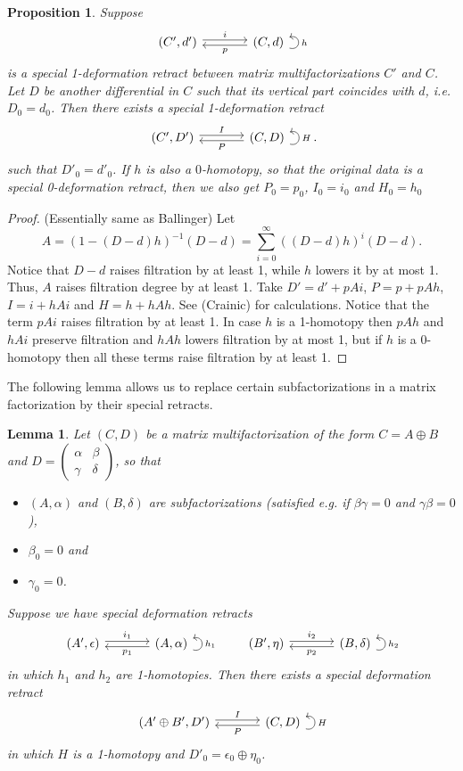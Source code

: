 \documentclass{article}
\newcommand{\sdr}[5]{%
  \begin{tikzcd}[column sep=large, ampersand replacement=\&]
    {#1} \arrow[r, "#3", shift left=0.5ex,] \arrow[r, leftarrow, "#4", shift right=0.5ex, swap] \& 
    {#2} \arrow[loop right, distance=1em, in=15, out=-15, "#5",swap]
  \end{tikzcd}%
}
\theoremstyle{plain} %
\newtheorem{lemma}[theorem]{Lemma}
\newtheorem{proposition}[theorem]{Proposition}
\theoremstyle{definition} %
\theoremstyle{remark} %
\begin{document}
\begin{proposition}\label{specialDefRetract}
Suppose 
$$\sdr{(C',d')}{(C,d)}{i}{p}{h}$$
is a special 1-deformation retract between matrix multifactorizations $C'$ and $C$. Let $D$ be another differential in $C$ such that its vertical part coincides with $d$, i.e. $D_0=d_0$. Then there exists a special 1-deformation retract
$$\sdr{(C',D')}{(C,D)}{I}{P}{H}.$$
such that $D'_0=d'_0$.
If $h$ is also a $0$-homotopy, so that the original data is a special 0-deformation retract, then we also get $P_0=p_0$, $I_0=i_0$ and $H_0=h_0$
\end{proposition}


\begin{proof}(Essentially same as Ballinger) Let 
$$A=(1-(D-d)h)^{-1}(D-d)=\sum_{i=0}^{\infty} ((D-d)h)^i(D-d). $$
Notice that $D-d$ raises filtration by at least 1, while $h$ lowers it by at most 1. Thus, $A$ raises filtration degree by at least 1.
Take $D'=d'+pAi$, $P=p+pAh$, $I=i+hAi$ and $H=h+hAh$. See (Crainic) for calculations. Notice that the term $pAi$ raises filtration by at least 1. In case $h$ is a 1-homotopy then $pAh$ and $hAi$ preserve filtration and $hAh$ lowers filtration by at most 1, but if $h$ is a 0-homotopy then all these terms raise filtration by at least 1.
\end{proof}
    
The following lemma allows us to replace certain subfactorizations in a matrix factorization by their special retracts.

\begin{lemma}\label{SummandLemma}
Let $(C,D)$ be a matrix multifactorization of the form $C=A\oplus B$ and 
$D=\begin{pmatrix}\alpha & \beta \\ \gamma & \delta \end{pmatrix}$, so that \begin{itemize}
    \item $(A,\alpha)$ and $(B,\delta)$ are subfactorizations (satisfied e.g. if $\beta\gamma=0$ and $\gamma\beta=0$), 
    \item $\beta_0=0$  and
    \item $\gamma_0=0$.
\end{itemize}Suppose we have special deformation retracts $$\sdr{(A',\epsilon)}{(A,\alpha)}{i_1}{p_1}{h_1}\qquad\sdr{(B',\eta)}{(B,\delta)}{i_2}{p_2}{h_2}$$ in which $h_1$ and $h_2$ are 1-homotopies. Then there exists a special deformation retract
$$\sdr{(A'\oplus B',D')}{(C,D)}{I}{P}{H}$$
in which $H$ is a 1-homotopy and $D'_0=\epsilon_0\oplus \eta_0$.


\end{lemma}
\end{document}
